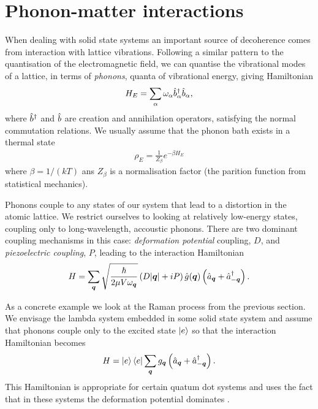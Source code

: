 \section{Phonon-matter interactions}

When dealing with solid state systems an important source of decoherence comes from interaction with lattice vibrations. Following a similar pattern to the quantisation of the electromagnetic field, we can quantise the vibrational modes of a lattice, in terms of \textit{phonons}, quanta of vibrational energy, giving Hamiltonian
\begin{align}
  H_E = \sum_\alpha \omega_\alpha \hat{b}^\dagger_\alpha \hat{b}_\alpha,
\end{align}
where $\hat{b}^\dagger$ and $\hat{b}$ are creation and annihilation operators, satisfying the normal commutation relations. We usually assume that the phonon bath exists in a thermal state
\begin{align}
  \rho_E = \frac{1}{Z_\beta} e^{-\beta H_E}
\end{align}
where $\beta = 1/(kT)$ ans $Z_\beta$ is a normalisation factor (the parition function from statistical mechanics).

Phonons couple to any states of our system that lead to a distortion in the atomic lattice. We restrict ourselves to looking at relatively low-energy states, coupling only to long-wavelength, accoustic phonons. There are two dominant coupling mechanisms in this case: \textit{deformation potential} coupling, $D$, and \textit{piezoelectric coupling}, $P$, \cite{mahan} leading to the interaction Hamiltonian
\begin{align}
  H = \sum_{{\boldsymbol{q}}} \sqrt{\frac{\hbar}{2\mu V\omega_{{\boldsymbol{q}}}}} \left(D \vert {\boldsymbol{q}}\vert + iP \right)\hat{g}({\boldsymbol{q}})\left(\hat{a}_{{\boldsymbol{q}}} + \hat{a}^\dagger_{-{\boldsymbol{q}}} \right).
\end{align}

As a concrete example we look at the Raman process from the previous section. We envisage the lambda system embedded in some solid state system and assume that phonons couple only to the excited state $\left\vert e\right\rangle$ so that the interaction Hamiltonian becomes
\begin{align}
  H = \left\vert e\right\rangle\left\langle e\right\vert\sum_{{\boldsymbol{q}}} g_{{\boldsymbol{q}}}\left(\hat{a}_{{\boldsymbol{q}}} + \hat{a}^\dagger_{-{\boldsymbol{q}}}\right).
\end{align}
This Hamiltonian is appropriate for certain quatum dot systems \cite{erik_qd_paper} and uses the fact that in these systems the deformation potential dominates \cite{ep76, ep138}.

